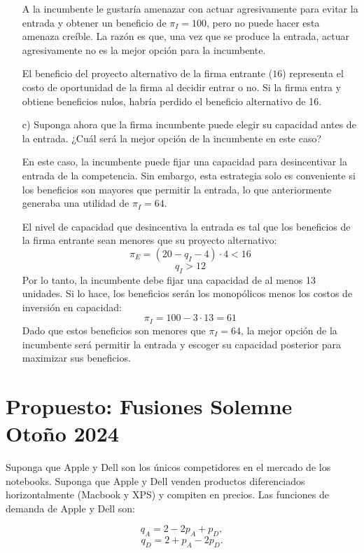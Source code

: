 \documentclass{exam}
\begin{document}
\begin{itemize}
\begin{solution}
        A la incumbente le gustaría amenazar con actuar agresivamente para evitar la entrada y obtener un beneficio de \( \pi_I = 100 \), pero no puede hacer esta amenaza creíble. La razón es que, una vez que se produce la entrada, actuar agresivamente no es la mejor opción para la incumbente.

        El beneficio del proyecto alternativo de la firma entrante (\( 16 \)) representa el costo de oportunidad de la firma al decidir entrar o no. Si la firma entra y obtiene beneficios nulos, habría perdido el beneficio alternativo de 16.
    \end{solution}
    \item[c)] Suponga ahora que la firma incumbente puede elegir su capacidad antes de la entrada. ¿Cuál será la mejor opción de la incumbente en este caso?
    \begin{solution}
        En este caso, la incumbente puede fijar una capacidad para desincentivar la entrada de la competencia. Sin embargo, esta estrategia solo es conveniente si los beneficios son mayores que permitir la entrada, lo que anteriormente generaba una utilidad de \( \pi_I = 64 \).

        El nivel de capacidad que desincentiva la entrada es tal que los beneficios de la firma entrante sean menores que su proyecto alternativo:
        \[
        \pi_E = (20 - q_I - 4) \cdot 4 < 16
        \]
        \[
        q_I > 12
        \]
        Por lo tanto, la incumbente debe fijar una capacidad de al menos 13 unidades. Si lo hace, los beneficios serán los monopólicos menos los costos de inversión en capacidad:
        \[
        \pi_I = 100 - 3 \cdot 13 = 61
        \]
        Dado que estos beneficios son menores que \( \pi_I = 64 \), la mejor opción de la incumbente será permitir la entrada y escoger su capacidad posterior para maximizar sus beneficios.
    \end{solution}
\end{itemize}

\section{Propuesto: Fusiones Solemne Otoño 2024}

Suponga que Apple y Dell son los únicos competidores en el mercado de los notebooks. Suponga
que Apple y Dell venden productos diferenciados horizontalmente (Macbook y XPS) y compiten
en precios. Las funciones de demanda de Apple y Dell son:

\[
q_A = 2 - 2p_A + p_D,
\]
\[
q_D = 2 + p_A - 2p_D.
\]
\end{document}
